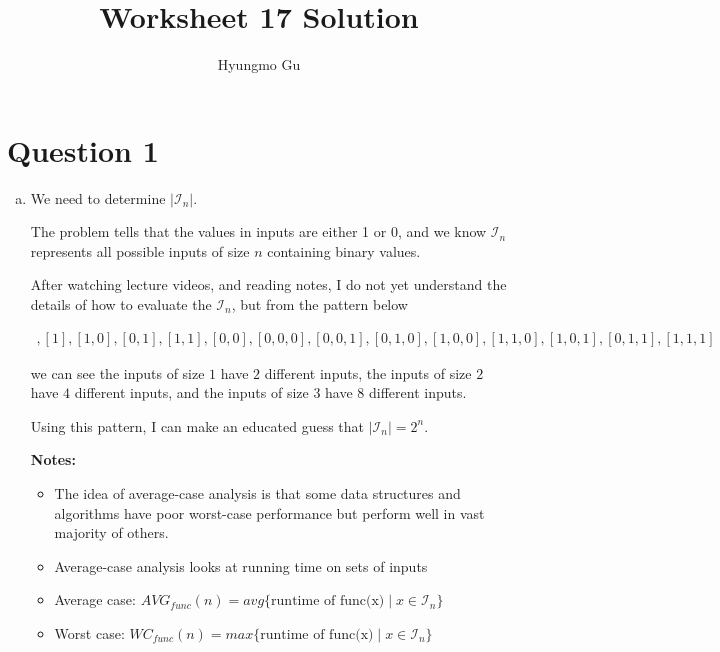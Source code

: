 \documentclass[12pt]{article}
\begin{document}
\title{Worksheet 17 Solution}
\author{Hyungmo Gu}
\maketitle

\section*{Question 1}
\begin{enumerate}[a.]
    \item

    We need to determine $\lvert \mathcal{I}_n \rvert$.

    \bigskip

    The problem tells that the values in inputs are either 1 or 0, and we know
    $\mathcal{I}_n$ represents all possible inputs of size $n$ containing binary values.

    \bigskip

    After watching lecture videos, and reading notes, I do not yet understand the details
    of how to evaluate the $\mathcal{I}_n$, but from the pattern below

    \begin{align*}
        [0], [1], [1,0], [0,1], [1,1], [0,0], [0,0,0],[0,0,1],[0,1,0],[1,0,0],
        [1,1,0],[1,0,1],[0,1,1],[1,1,1]
    \end{align*}

    we can see the inputs of size $1$ have $2$ different inputs, the inputs of size $2$ have $4$
    different inputs, and the inputs of size $3$ have $8$ different inputs.

    \bigskip

    Using this pattern, I can make an educated guess that $\lvert \mathcal{I}_n \rvert = 2^n$.

    \bigskip

    \textbf{Notes:}

    \begin{itemize}
     \item The idea of average-case analysis is that some data structures and
     algorithms have poor worst-case performance but perform well in vast majority
     of others.

    \item Average-case analysis looks at running time on sets of inputs
    \item Average case: $AVG_{func}(n) = avg \{ \text{runtime of func(x)} \mid x \in \mathcal{I}_n \}$
    \item Worst case: $WC_{func}(n) = max \{ \text{runtime of func(x)} \mid x \in \mathcal{I}_n \}$

    \end{itemize}


\end{enumerate}
\end{document}
